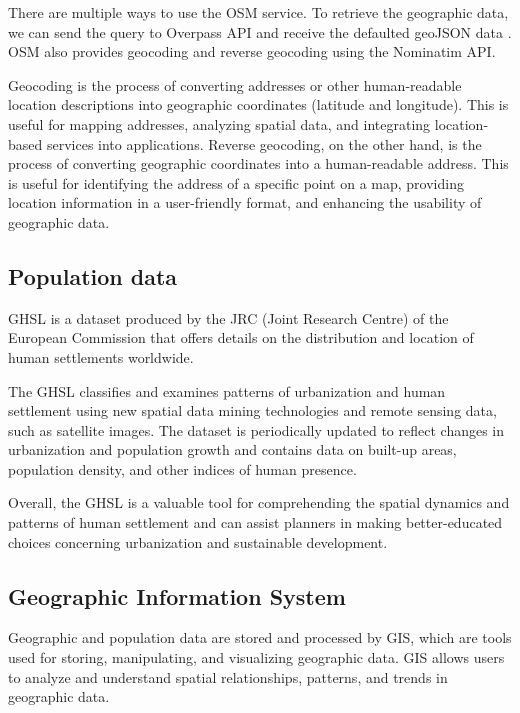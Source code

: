 \documentclass[12pt]{report}
\begin{document}
        There are multiple ways to use the OSM service. To retrieve the geographic data, we can send the query to
        Overpass \ac{API} and receive the defaulted \ac{geoJSON} data \cite{openstreet_overpass_2022}. OSM also provides
        geocoding and reverse geocoding using the Nominatim API.
            
        Geocoding is the process of converting addresses or other human-readable location descriptions into geographic
        coordinates (latitude and longitude). This is useful for mapping addresses, analyzing spatial data, and
        integrating location-based services into applications. Reverse geocoding, on the other hand, is the process of
        converting geographic coordinates into a human-readable address. This is useful for identifying the address of a
        specific point on a map, providing location information in a user-friendly format, and enhancing the usability
        of geographic data.

        \subsection{Population data}
            GHSL \cite{commission_ghsl_2023} is a dataset produced by the JRC (Joint Research Centre) of the European
            Commission that offers details on the distribution and location of human settlements worldwide.

            The GHSL classifies and examines patterns of urbanization and human settlement using new spatial data mining
            technologies and remote sensing data, such as satellite images. The dataset is periodically updated to
            reflect changes in urbanization and population growth and contains data on built-up areas, population
            density, and other indices of human presence.

            Overall, the GHSL is a valuable tool for comprehending the spatial dynamics and patterns of human settlement
            and can assist planners in making better-educated choices concerning urbanization and sustainable
            development.

            \subsection{Geographic Information System}
            Geographic and population data are stored and processed by \ac{GIS}, which are tools used for storing,
            manipulating, and visualizing geographic data. GIS allows users to analyze and understand spatial
            relationships, patterns, and trends in geographic data.
                
\end{document}
